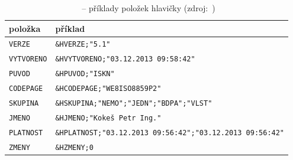 \begin{table}[H]
    \begin{tabular}{|l|l|} \hline položka & příklad \\ \hline \hline
\texttt{VERZE} & \texttt{\&HVERZE;"5.1"} \\ \hline \texttt{VYTVORENO}
& \texttt{\&HVYTVORENO;"03.12.2013 09:58:42"} \\ \hline \texttt{PUVOD}
& \texttt{\&HPUVOD;"ISKN"} \\ \hline \texttt{CODEPAGE} &
\texttt{\&HCODEPAGE;"WE8ISO8859P2"} \\ \hline \texttt{SKUPINA} &
\texttt{\&HSKUPINA;"NEMO";"JEDN";"BDPA";"VLST"} \\ \hline
\texttt{JMENO} & \texttt{\&HJMENO;"Kokeš Petr Ing."} \\ \hline
\texttt{PLATNOST} & \texttt{\&HPLATNOST;"03.12.2013
09:56:42";"03.12.2013 09:56:42"} \\ \hline \texttt{ZMENY} &
\texttt{\&HZMENY;0} \\ \hline
    \end{tabular} \centering
    \caption[~– příklady položek hlavičky]{~– příklady
položek hlavičky (zdroj:~\citep{struktura_vfk})}
    \label{tab:hlavicka_priklady}
\end{table}

